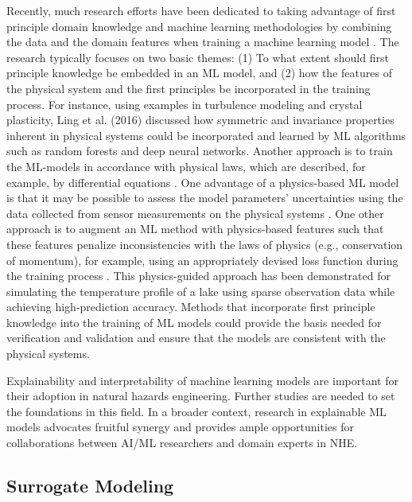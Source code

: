 Recently, much research efforts have been dedicated to taking advantage of first principle domain knowledge and machine learning methodologies by combining the data and the domain features when training a machine learning model \citep{willard2020integrating}. The research typically focuses on two basic themes: (1) To what extent should first principle knowledge be embedded in an ML model, and (2) how the features of the physical system and the first principles be incorporated in the training process. For instance, using examples in turbulence modeling and crystal plasticity, Ling et al. (2016) discussed how symmetric and invariance properties inherent in physical systems could be incorporated and learned by ML algorithms such as random forests and deep neural networks. Another approach is to train the ML-models in accordance with physical laws, which are described, for example, by differential equations \citep{raissi2019physicsinformed}. One advantage of a physics-based ML model is that it may be possible to assess the model parameters' uncertainties using the data collected from sensor measurements on the physical systems \citep{zhang2019quantifying}. One other approach is to augment an ML method with physics-based features such that these features penalize inconsistencies with the laws of physics (e.g., conservation of momentum), for example, using an appropriately devised loss function during the training process \citep{jia2020physicsguided}. This physics-guided approach has been demonstrated for simulating the temperature profile of a lake using sparse observation data while achieving high-prediction accuracy. Methods that incorporate first principle knowledge into the training of ML models could provide the basis needed for verification and validation and ensure that the models are consistent with the physical systems. 

Explainability and interpretability of machine learning models are important for their adoption in natural hazards engineering. Further studies are needed to set the foundations in this field. In a broader context, research in explainable ML models advocates fruitful synergy and provides ample opportunities for collaborations between AI/ML researchers and domain experts in NHE.

\subsection{Surrogate Modeling}

